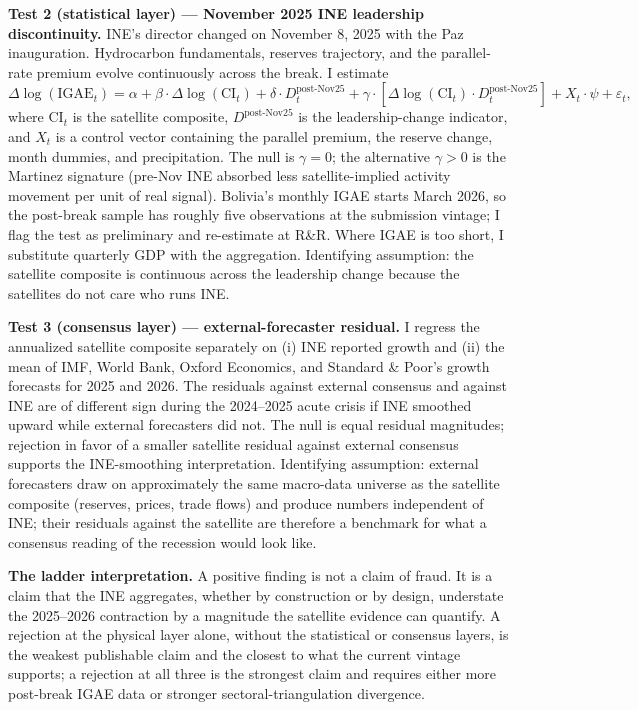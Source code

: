 \documentclass[11pt,letterpaper]{article}
\newcommand{\claim}[1]{\textbf{#1.}}
\begin{document}
\claim{Test 2 (statistical layer) --- November 2025 INE leadership discontinuity} INE's director changed on November 8, 2025 with the Paz inauguration. Hydrocarbon fundamentals, reserves trajectory, and the parallel-rate premium evolve continuously across the break. I estimate
\begin{equation}
\Delta \log(\text{IGAE}_t) = \alpha + \beta \cdot \Delta \log(\text{CI}_t) + \delta \cdot D^{\text{post-Nov25}}_t + \gamma \cdot [\Delta \log(\text{CI}_t) \cdot D^{\text{post-Nov25}}_t] + X_t \cdot \psi + \varepsilon_t,
\label{eq:leadership_break}
\end{equation}
where $\text{CI}_t$ is the satellite composite, $D^{\text{post-Nov25}}$ is the leadership-change indicator, and $X_t$ is a control vector containing the parallel premium, the reserve change, month dummies, and precipitation. The null is $\gamma = 0$; the alternative $\gamma > 0$ is the Martinez signature (pre-Nov INE absorbed less satellite-implied activity movement per unit of real signal). Bolivia's monthly IGAE starts March 2026, so the post-break sample has roughly five observations at the submission vintage; I flag the test as preliminary and re-estimate at R\&R. Where IGAE is too short, I substitute quarterly GDP with the \citet{mariano_murasawa2003} aggregation. Identifying assumption: the satellite composite is continuous across the leadership change because the satellites do not care who runs INE.

\claim{Test 3 (consensus layer) --- external-forecaster residual} I regress the annualized satellite composite separately on (i) INE reported growth and (ii) the mean of IMF, World Bank, Oxford Economics, and Standard \& Poor's growth forecasts for \num{2025} and \num{2026}. The residuals against external consensus and against INE are of different sign during the 2024--2025 acute crisis if INE smoothed upward while external forecasters did not. The null is equal residual magnitudes; rejection in favor of a smaller satellite residual against external consensus supports the INE-smoothing interpretation. Identifying assumption: external forecasters draw on approximately the same macro-data universe as the satellite composite (reserves, prices, trade flows) and produce numbers independent of INE; their residuals against the satellite are therefore a benchmark for what a consensus reading of the recession would look like.

\claim{The ladder interpretation} A positive finding is not a claim of fraud. It is a claim that the INE aggregates, whether by construction or by design, understate the \numrange{2025}{2026} contraction by a magnitude the satellite evidence can quantify. A rejection at the physical layer alone, without the statistical or consensus layers, is the weakest publishable claim and the closest to what the current vintage supports; a rejection at all three is the strongest claim and requires either more post-break IGAE data or stronger sectoral-triangulation divergence.
\end{document}
